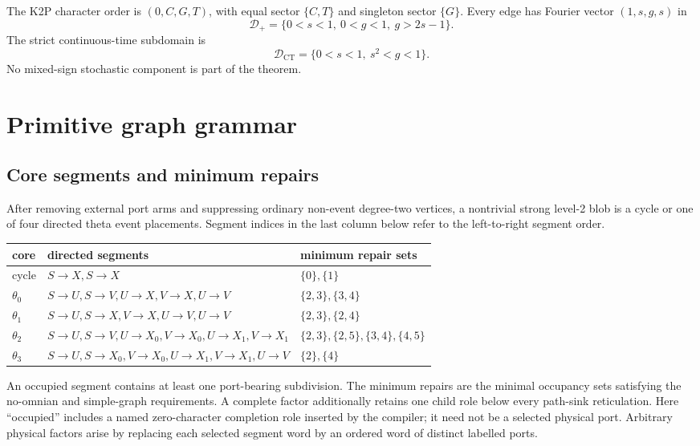 \documentclass[11pt]{article}
\theoremstyle{remark}
\newcommand{\Dplus}{\mathcal D_+}
\newcommand{\Dct}{\mathcal D_{\mathrm{CT}}}
\begin{document}
The K2P character order is \((0,C,G,T)\), with equal sector \(\{C,T\}\)
and singleton sector \(\{G\}\).  Every edge has Fourier vector
\((1,s,g,s)\) in
\[
 \Dplus=\{0<s<1,\ 0<g<1,\ g>2s-1\}.
\]
The strict continuous-time subdomain is
\[
 \Dct=\{0<s<1,\ s^2<g<1\}.
\]
No mixed-sign stochastic component is part of the theorem.

\section{Primitive graph grammar}\label{sec:grammar}

\subsection{Core segments and minimum repairs}

After removing external port arms and suppressing ordinary non-event degree-two
vertices, a nontrivial strong level-2 blob is a cycle or one of four directed
theta event placements.  Segment indices in the last column below refer to the
left-to-right segment order.

\begin{center}
\footnotesize
\begin{tabular}{L{.10\linewidth}L{.57\linewidth}L{.22\linewidth}}
\toprule
core & directed segments & minimum repair sets\\
\midrule
cycle & \(S\!\to X,S\!\to X\) & \(\{0\},\{1\}\)\\
\(\theta_0\) & \(S\!\to U,S\!\to V,U\!\to X,V\!\to X,U\!\to V\)
 & \(\{2,3\},\{3,4\}\)\\
\(\theta_1\) & \(S\!\to U,S\!\to X,V\!\to X,U\!\to V,U\!\to V\)
 & \(\{2,3\},\{2,4\}\)\\
\(\theta_2\) & \(S\!\to U,S\!\to V,U\!\to X_0,V\!\to X_0,
U\!\to X_1,V\!\to X_1\)
 & \(\{2,3\},\{2,5\},\{3,4\},\{4,5\}\)\\
\(\theta_3\) & \(S\!\to U,S\!\to X_0,V\!\to X_0,U\!\to X_1,
V\!\to X_1,U\!\to V\)
 & \(\{2\},\{4\}\)\\
\bottomrule
\end{tabular}
\end{center}

An occupied segment contains at least one port-bearing subdivision.  The
minimum repairs are the minimal occupancy sets satisfying the no-omnian and
simple-graph requirements.  A complete factor additionally retains one child
role below every path-sink reticulation.  Here ``occupied'' includes a named
zero-character completion role inserted by the compiler; it need not be a
selected physical port.  Arbitrary physical factors arise by replacing each
selected segment word by an ordered word of distinct labelled ports.
\end{document}
